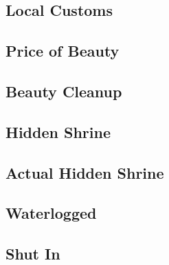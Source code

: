 

\subsection{Local Customs}


\subsection{Price of Beauty}


\subsection{Beauty Cleanup}


\subsection{Hidden Shrine}


\subsection{Actual Hidden Shrine}


\subsection{Waterlogged}


\subsection{Shut In}

